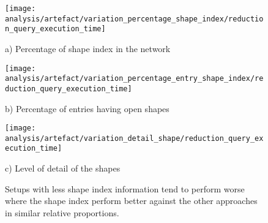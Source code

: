 \begin{figure}[htbp]
    \centering
    \begin{minipage}{0.32\textwidth}
        \centering
        \texttt{[image: analysis/artefact/variation\_percentage\_shape\_index/reduction\_query\_execution\_time]}
        \caption*{a) Percentage of shape index in the network}
        \label{fig:varPercentShapeIndex}
    \end{minipage}
    \hfill
    \begin{minipage}{0.32\textwidth}
        \centering
        \texttt{[image: analysis/artefact/variation\_percentage\_entry\_shape\_index/reduction\_query\_execution\_time]}
        \caption*{b) Percentage of entries having open shapes}
        \label{fig:varPercentEntries}
    \end{minipage}
    \hfill
    \begin{minipage}{0.32\textwidth}
        \centering
        \texttt{[image: analysis/artefact/variation\_detail\_shape/reduction\_query\_execution\_time]}
        \caption*{c) Level of detail of the shapes}
        \label{fig:varShapeDetail}
    \end{minipage}

    \caption{Setups with less shape index information tend to perform worse where the shape index perform
    better against the other approaches in similar relative proportions.
    }
    \label{fig:adaptShapeIndex}
\end{figure}

